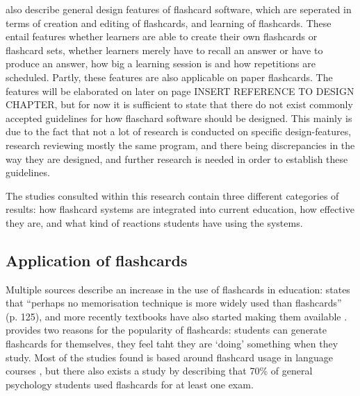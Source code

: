  also describe general design features of flashcard software, which are seperated in terms of creation and editing of flashcards, and learning of flashcards. These entail features whether learners are able to create their own flashcards or flashcard sets, whether learners merely have to recall an answer or have to produce an answer, how big a learning session is and how repetitions are scheduled. Partly, these features are also applicable on paper flashcards. The features will be elaborated on later on page INSERT REFERENCE TO DESIGN CHAPTER, but for now it is sufficient to state that there do not exist commonly accepted guidelines for how flaschard software should be designed. This mainly is due to the fact that not a lot of research is conducted on specific design-features, research reviewing mostly the same program, and there being discrepancies in the way they are designed, and further research is needed in order to establish these guidelines.


The studies consulted within this research contain three different categories of results: how flashcard systems are integrated into current education, how effective they are, and what kind of reactions students have using the systems.

\subsection{Application of flashcards}

Multiple sources describe an increase in the use of flashcards in education:  states that ``perhaps no memorisation technique is more widely used than flashcards'' (p. 125), and more recently textbooks have also started making them available \cite{burgess, golding}.  provides two reasons for the popularity of flashcards: students can generate flashcards for themselves, they feel taht they are `doing' something when they study. Most of the studies found is based around flashcard usage in language courses \cite{nakata, joseph, chien}, but there also exists a study by  describing that 70\% of general psychology students used flashcards for at least one exam.

